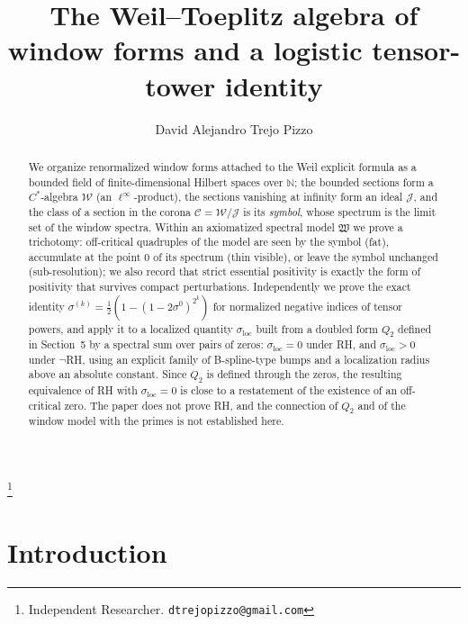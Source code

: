 \documentclass[11pt,reqno]{amsart}
\theoremstyle{definition}
\newcommand{\W}{\mathcal{W}}
\newcommand{\Jc}{\mathcal{J}}
\newcommand{\Cor}{\mathcal{C}}
\newcommand{\N}{\mathbb{N}}
\newcommand{\half}{\tfrac12}
\begin{document}
\title[The Weil--Toeplitz algebra of window forms]{The Weil--Toeplitz algebra of window forms and a logistic tensor-tower identity}

\author{David Alejandro Trejo Pizzo}
\thanks{Independent Researcher. \texttt{dtrejopizzo@gmail.com}}

\begin{abstract}
We organize renormalized window forms attached to the Weil explicit formula as a
bounded field of finite-dimensional Hilbert spaces over \(\N\); the bounded
sections form a \(C^*\)-algebra \(\W\) (an \(\ell^\infty\)-product), the
sections vanishing at infinity form an ideal \(\Jc\), and the class of a
section in the corona \(\Cor=\W/\Jc\) is its \emph{symbol}, whose spectrum is
the limit set of the window spectra. Within an axiomatized spectral model
\(\mathfrak W\) we prove a trichotomy: off-critical quadruples of the model are
seen by the symbol (fat), accumulate at the point \(0\) of its spectrum (thin
visible), or leave the symbol unchanged (sub-resolution); we also record that
strict essential positivity is exactly the form of positivity that survives
compact perturbations. Independently we prove the exact identity
\(\sigma^{(k)}=\half(1-(1-2\sigma^0)^{2^k})\) for normalized negative indices of
tensor powers, and apply it to a localized quantity \(\sigma_{\mathrm{loc}}\)
built from a doubled form \(Q_2\) defined in Section~5 by a spectral sum over
pairs of zeros: \(\sigma_{\mathrm{loc}}=0\) under RH, and
\(\sigma_{\mathrm{loc}}>0\) under \(\neg\)RH, using an explicit family of
B-spline-type bumps and a localization radius above an absolute constant. Since
\(Q_2\) is defined through the zeros, the resulting equivalence of RH with
\(\sigma_{\mathrm{loc}}=0\) is close to a restatement of the existence of an
off-critical zero. The paper does not prove RH, and the connection of \(Q_2\)
and of the window model with the primes is not established here.
\end{abstract}

\maketitle

\tableofcontents
\newpage

\section{Introduction}\label{sec:intro}
\end{document}
